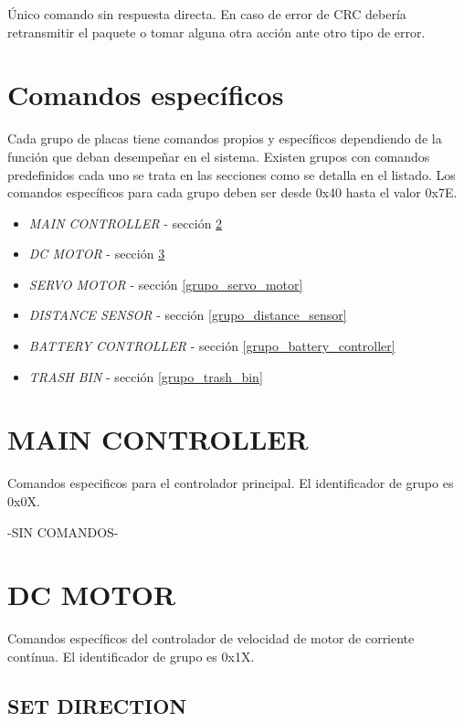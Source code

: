 \documentclass[a4paper,10pt]{article}
\begin{document}
\'Unico comando sin respuesta directa.
En caso de error de CRC deber\'ia retransmitir el paquete o tomar alguna otra acci\'on ante otro tipo de error.

\section{Comandos espec\'ificos}
\label{comandos_especificos}

Cada grupo de placas tiene comandos propios y espec\'ificos dependiendo de la funci\'on que deban desempe\~nar en el sistema.
Existen grupos con comandos predefinidos cada uno se trata en las secciones como se detalla en el listado.
Los comandos espec\'ificos para cada grupo deben ser desde 0x40 hasta el valor 0x7E.

\begin{itemize}
	\item \emph{MAIN CONTROLLER} - secci\'on \ref{grupo_main_controller}
	\item \emph{DC MOTOR} - secci\'on \ref{grupo_dc_motor}
	\item \emph{SERVO MOTOR} - secci\'on \ref{grupo_servo_motor}
	\item \emph{DISTANCE SENSOR} - secci\'on \ref{grupo_distance_sensor}
	\item \emph{BATTERY CONTROLLER} - secci\'on \ref{grupo_battery_controller}
	\item \emph{TRASH BIN} - secci\'on \ref{grupo_trash_bin}
\label{grupos_listado}
\end{itemize}

\section{MAIN CONTROLLER}
\label{grupo_main_controller}

Comandos especificos para el controlador principal.
El identificador de grupo es 0x0X.


-SIN COMANDOS-


\section{DC MOTOR}
\label{grupo_dc_motor}

Comandos espec\'ificos del controlador de velocidad de motor de corriente cont\'inua.
El identificador de grupo es 0x1X.

\subsection{SET DIRECTION}
\label{set_direction}
\end{document}
